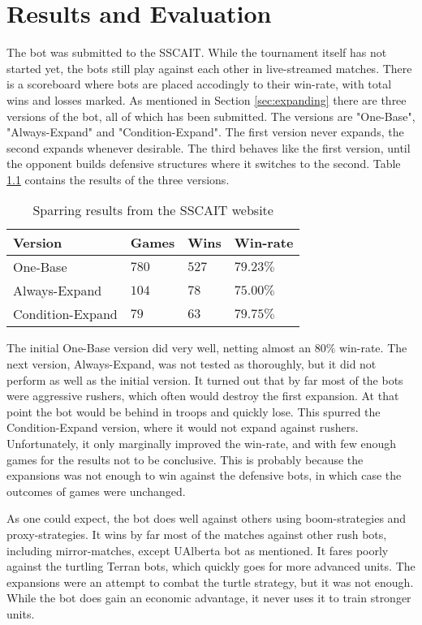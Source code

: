 \chapter{Results and Evaluation}
\label{ch:results}
The bot was submitted to the SSCAIT. While the tournament itself has not started yet, the bots still play against each other in live-streamed matches. There is a scoreboard where bots are placed accodingly to their win-rate, with total wins and losses marked. As mentioned in Section \ref{sec:expanding} there are three versions of the bot, all of which has been submitted. The versions are "One-Base", "Always-Expand" and "Condition-Expand". The first version never expands, the second expands whenever desirable. The third behaves like the first version, until the opponent builds defensive structures where it switches to the second. Table \ref{tab:results} contains the results of the three versions.

\begin{table}
\begin{center}
\begin{tabularx}{\linewidth}{|X||l|l|l|}
	\hline
	Version				& Games	& Wins	& Win-rate	\\
	\hline
	One-Base			& $780$	& $527$	& $79.23\%$	\\
	Always-Expand		& $104$	& $78$	& $75.00\%$	\\
	Condition-Expand	& $79$	& $63$	& $79.75\%$	\\
	\hline
\end{tabularx}
\end{center}
\caption{Sparring results from the SSCAIT website}
\label{tab:results}
\end{table}

The initial One-Base version did very well, netting almost an $80\%$ win-rate. The next version, Always-Expand, was not tested as thoroughly, but it did not perform as well as the initial version. It turned out that by far most of the bots were aggressive rushers, which often would destroy the first expansion. At that point the bot would be behind in troops and quickly lose. This spurred the Condition-Expand version, where it would not expand against rushers. Unfortunately, it only marginally improved the win-rate, and with few enough games for the results not to be conclusive. This is probably because the expansions was not enough to win against the defensive bots, in which case the outcomes of games were unchanged.

As one could expect, the bot does well against others using boom-strategies and proxy-strategies. It wins by far most of the matches against other rush bots, including mirror-matches, except UAlberta bot as mentioned. It fares poorly against the turtling Terran bots, which quickly goes for more advanced units. The expansions were an attempt to combat the turtle strategy, but it was not enough. While the bot does gain an economic advantage, it never uses it to train stronger units.

